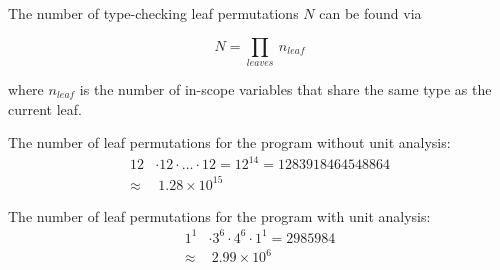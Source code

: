 \documentclass{beamer}
\begin{document}
\begin{frame}[fragile]
  The number of type-checking leaf permutations $N$ can be found via

  \begin{equation*}
  N = \prod_{leaves} \: n_{leaf}
  \end{equation*}

  where $n_{leaf}$ is the number of in-scope variables that share the same type as the current
  leaf.

  \vspace{2mm}
  \pause
  
  The number of leaf permutations for the program without unit analysis:
  \begin{align*}
    12 & \cdot 12 \cdot \dots \cdot 12 = 12^{14} = 1283918464548864 \\
    \approx & \: 1.28 \times 10^{15}
  \end{align*}

  \pause 

  The number of leaf permutations for the program with unit analysis:
  \begin{align*}
    1^1 & \cdot 3^6 \cdot 4^6 \cdot 1^1 = 2985984 \\
    \approx & \: 2.99 \times 10^6
  \end{align*}
\end{frame}
\end{document}
